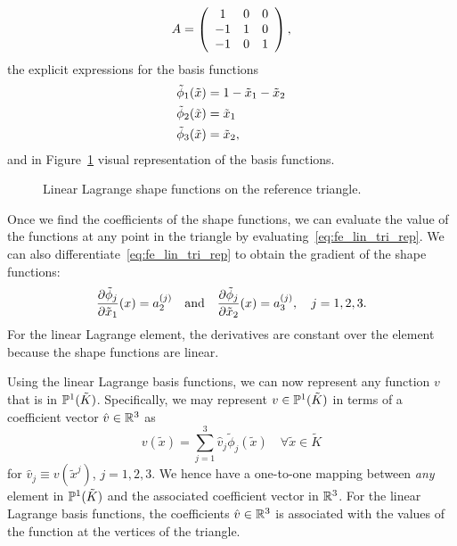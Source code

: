 \begin{equation*}
  A = \bmat{ccc}
  1 & 0 & 0\\
  -1 & 1 & 0 \\
  -1 & 0 & 1
  \emat,
\end{equation*}
the explicit expressions for the basis functions
\begin{align}
  \tilde \phi_1(\tilde x) &= 1 - \tilde x_1 - \tilde x_2 \notag \\
  \tilde \phi_2(\tilde x) &= \tilde x_1 \label{eq:fe_lin_tri_expl} \\
  \tilde \phi_3(\tilde x) &= \tilde x_2, \notag
\end{align}
and in Figure~\ref{fig:fe_shape_tri_p1} visual representation of the basis functions.

\begin{figure}
  \centering
  \caption{Linear Lagrange shape functions on the reference triangle.}
  \label{fig:fe_shape_tri_p1}
\end{figure}

Once we find the coefficients of the shape functions, we can evaluate the value of the functions at any point in the triangle by evaluating~\eqref{eq:fe_lin_tri_rep}. We can also differentiate~\eqref{eq:fe_lin_tri_rep} to obtain the gradient of the shape functions:
\begin{align*}
  \pp{\tilde \phi_j}{\tilde x_1}(x) = a_2^{(j)}
  \quad \text{and} \quad
  \pp{\tilde \phi_j}{\tilde x_2}(x) = a_3^{(j)}, \quad j = 1,2,3.
\end{align*}
For the linear Lagrange element, the derivatives are constant over the element because the shape functions are linear.

Using the linear Lagrange basis functions, we can now represent any function $v$ that is in $\PP^1(\tilde K)$.  Specifically, we may represent $v \in \PP^1(\tilde K)$ in terms of a coefficient vector $\hat v \in \RR^3$ as
\begin{equation*}
  v(\tilde x) = \sum_{j=1}^{3} \hat v_j  \tilde \phi_j(\tilde x) \quad \forall \tilde x \in \tilde K
\end{equation*}
for $\hat v_j \equiv v(\tilde x^j)$, $j = 1,2,3$.  We hence have a one-to-one mapping between \emph{any} element in $\PP^1(\tilde K)$ and the associated coefficient vector in $\RR^3$.  For the linear Lagrange basis functions, the coefficients $\hat v \in \RR^3$ is associated with the values of the function at the vertices of the triangle.

